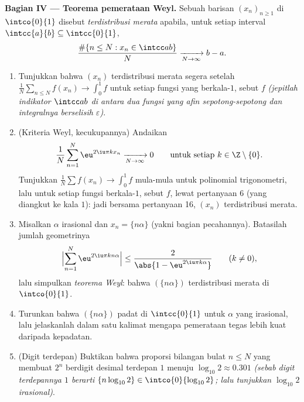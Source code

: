 \begin{problem}
\medskip
\noindent\textbf{Bagian IV --- Teorema pemerataan Weyl.}
Sebuah barisan $(x_n)_{n\geq1}$ di $\intco{0}{1}$ disebut
\emph{terdistribusi merata} apabila, untuk setiap interval
$\intcc{a}{b} \subseteq \intcc{0}{1}$,
\[
\frac{\#\{n \leq N : x_n \in \intcc ab\}}{N}
\xrightarrow[N\to\infty]{} b - a .
\]
\begin{enumerate}[resume]
  \item Tunjukkan bahwa $(x_n)$ terdistribusi merata segera setelah
        $\frac1N\sum_{n\leq N}f(x_n) \to \int_0^1 f$ untuk setiap fungsi
        \emph{} yang berkala-$1$, sebut $f$ \emph{(jepitlah indikator
        $\intcc ab$ di antara dua fungsi  yang
        afin sepotong-sepotong dan integralnya berselisih
        $\varepsilon$)}.
  \item (Kriteria Weyl, kecukupannya) Andaikan
        \[
        \frac{1}{N}\sum_{n=1}^{N}\eu^{2\iu\pi kx_n}
        \xrightarrow[N\to\infty]{} 0
        \qquad\text{untuk setiap } k \in \Z\setminus\{0\} .
        \]
        Tunjukkan $\frac1N\sum f(x_n) \to \int_0^1f$ mula-mula untuk
        polinomial trigonometri, lalu untuk setiap fungsi 
        berkala-$1$, sebut $f$, lewat pertanyaan 6 (yang diangkut ke kala
        $1$): jadi bersama pertanyaan 16, $(x_n)$ terdistribusi merata.
  \item Misalkan $\alpha$ irasional dan $x_n = \{n\alpha\}$
        (yakni bagian pecahannya). Batasilah jumlah geometrinya
        \[
        \Bigl|\sum_{n=1}^{N}\eu^{2\iu\pi kn\alpha}\Bigr|
        \leq \frac{2}{\abs{1 - \eu^{2\iu\pi k\alpha}}}
        \qquad (k \neq 0),
        \]
        lalu simpulkan \emph{teorema Weyl}: bahwa $(\{n\alpha\})$
        terdistribusi merata di $\intco{0}{1}$.
  \item Turunkan bahwa $(\{n\alpha\})$ padat di
        $\intcc{0}{1}$ untuk $\alpha$ yang irasional, lalu jelaskanlah dalam
        satu kalimat mengapa pemerataan tegas lebih kuat
        daripada kepadatan.
  \item (Digit terdepan) Buktikan bahwa proporsi bilangan bulat
        $n \leq N$ yang membuat $2^n$ berdigit desimal terdepan
        $1$ menuju $\log_{10}2 \approx 0.301$ \emph{(sebab digit
        terdepannya $1$ berarti $\{n\log_{10}2\} \in
        \intco{0}{\log_{10}2}$; lalu tunjukkan $\log_{10}2$
        irasional)}.
\end{enumerate}


\end{problem}
